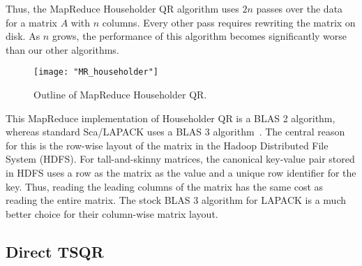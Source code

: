 \documentclass[10pt, conference, compsocconf]{IEEEtran}
\begin{document}
Thus, the MapReduce Householder QR algorithm uses $2n$ passes over the data for a matrix $A$ with $n$ columns.  Every other pass requires rewriting the matrix on disk.  As $n$ grows, the performance of this algorithm becomes significantly worse than our other algorithms.

\begin{figure*}
\centering
\texttt{[image: "MR\_householder"]}
\caption{Outline of MapReduce Householder QR.}
\label{fig:MR_householder}
\end{figure*}

This MapReduce implementation of Householder QR is a BLAS 2 algorithm, whereas standard Sca/LAPACK uses a BLAS 3 algorithm~\cite{lapack-guide-1999,choi-1995-scalapack}.  The central reason for this is the row-wise layout of the matrix in the Hadoop Distributed File System (HDFS).  For tall-and-skinny matrices, the canonical key-value pair stored in HDFS uses a row as the matrix as the value and a unique row identifier for the key.  Thus, reading the leading columns of the matrix has the same cost as reading the entire matrix.  The stock BLAS 3 algorithm for LAPACK is a much better choice for their column-wise matrix layout.

\subsection{Direct TSQR}\label{sec:direct_tsqr}
\end{document}
